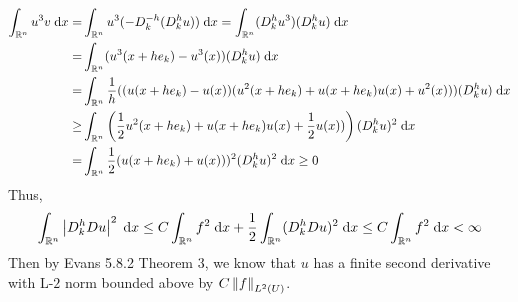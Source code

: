 \begin{align*}
  \int_{\reals^n} u^3 v \dx = &\int_{\reals^n} u^3 (-\diffquotdir{-h}{k} (\diffquotdir{h}{k} u)) \dx
    = \int_{\reals^n} (\diffquotdir{h}{k} u^3) (\diffquotdir{h}{k} u) \dx\\
    = &\int_{\reals^n} (u^3(x + h e_k) - u^3(x)) (\diffquotdir{h}{k} u) \dx\\
    = &\int_{\reals^n} \frac{1}{h}((u(x + h e_k) - u(x)) (u^2(x + h e_k) + u(x + h e_k) u(x) + u^2(x))) (\diffquotdir{h}{k} u) \dx\\
 \geq &\int_{\reals^n} \left(\frac{1}{2} u^2(x + h e_k) + u(x + h e_k) u(x) + \frac{1}{2} u(x)) \right) (\diffquotdir{h}{k} u)^2 \dx\\
    = &\int_{\reals^n} \frac{1}{2}(u(x + h e_k) + u(x)))^2 (\diffquotdir{h}{k} u)^2 \dx
    \geq 0
\end{align*}
Thus,
\begin{align*}
  \int_{\reals^n} \left|\diffquotdir{h}{k} \grad u \right|^2 \dx
    \leq C \int_{\reals^n} f^2 \dx
       + \frac{1}{2} \int_{\reals^n} (\diffquotdir{h}{k} \grad u)^2 \dx
    \leq C \int_{\reals^n} f^2 \dx < \infty
\end{align*}
Then by Evans 5.8.2 Theorem 3, we know that $u$ has a finite second derivative with L-$2$ norm bounded above by
$C \lnormdom{f}{2}$.
